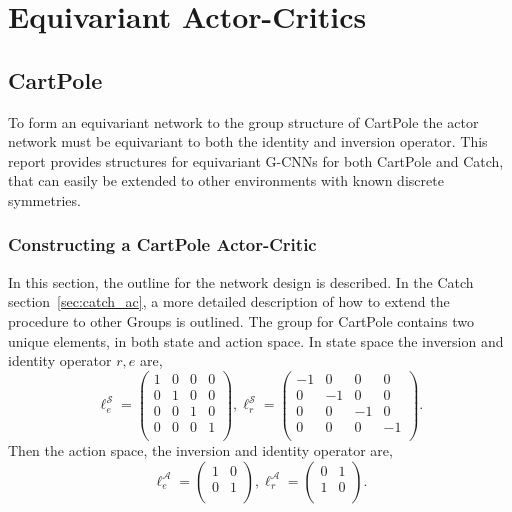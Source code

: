 \section{Equivariant Actor-Critics}\label{sec:actor-critic}
\subsection{CartPole}

To form an equivariant network to the group structure of CartPole the actor network must be equivariant to both the identity and inversion operator. This report provides structures for equivariant G-CNNs for both CartPole and Catch, that can easily be extended to other environments with known discrete symmetries.

\subsubsection{Constructing a CartPole Actor-Critic}
In this section, the outline for the network design is described. In the Catch section~\ref{sec:catch_ac}, a more detailed description of how to extend the procedure to other Groups is outlined.
The group for CartPole contains two unique elements, in both state and action space. In state space the inversion and identity operator $r, e$ are,
\begin{equation}
	\ell^\mathcal{S}_e =
	\begin{pmatrix}
		1 & 0 & 0 & 0 \\
		0 & 1 & 0 & 0 \\
		0 & 0 & 1 & 0 \\
		0 & 0 & 0 & 1 \\
	\end{pmatrix},
	\ell^\mathcal{S}_r =
	\begin{pmatrix}
		-1 & 0  & 0  & 0  \\
		0  & -1 & 0  & 0  \\
		0  & 0  & -1 & 0  \\
		0  & 0  & 0  & -1 \\
	\end{pmatrix}.
\end{equation}
Then the action space, the inversion and identity operator are,
\begin{equation}
	\ell^\mathcal{A}_e =
	\begin{pmatrix}
		1 & 0 \\
		0 & 1 \\
	\end{pmatrix},
	\ell^\mathcal{A}_r =
	\begin{pmatrix}
		0 & 1 \\
		1 & 0 \\
	\end{pmatrix}.
\end{equation}
